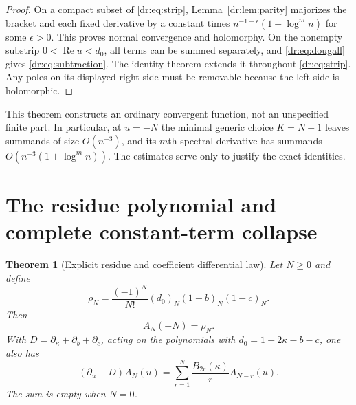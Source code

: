 \documentclass[11pt,letterpaper]{article}
\numberwithin{equation}{section}
\newtheorem{theorem}{Theorem}[section]
\theoremstyle{definition}
\theoremstyle{remark}
\DeclareMathOperator{\Rea}{Re}
\begin{document}
\begin{proof}
On a compact subset of \eqref{dr:eq:strip}, Lemma~\ref{dr:lem:parity}
majorizes the bracket and each fixed derivative by a constant times
$n^{-1-\epsilon}(1+\log^m n)$ for some $\epsilon>0$. This proves normal
convergence and holomorphy. On the nonempty substrip $0<\Rea u<d_0$,
all terms can be summed separately, and \eqref{dr:eq:dougall} gives
\eqref{dr:eq:subtraction}. The identity theorem extends it throughout
\eqref{dr:eq:strip}. Any poles on its displayed right side must be
removable because the left side is holomorphic.
\end{proof}

This theorem constructs an ordinary convergent function, not an
unspecified finite part. In particular, at $u=-N$ the minimal generic
choice $K=N+1$ leaves summands of size $O(n^{-3})$, and its $m$th
spectral derivative has summands $O(n^{-3}(1+\log^m n))$. The estimates
serve only to justify the exact identities.

\section{The residue polynomial and complete constant-term collapse}
\label{dr:sec:collapse}

\begin{theorem}[Explicit residue and coefficient differential law]
\label{dr:thm:coefficient-law}
Let $N\geq0$ and define
\begin{equation}
 \rho_N=\frac{(-1)^N}{N!}(d_0)_N(1-b)_N(1-c)_N.
 \label{dr:eq:rho}
\end{equation}
Then
\begin{equation}
 A_N(-N)=\rho_N.
 \label{dr:eq:residue}
\end{equation}
With $D=\partial_\kappa+\partial_b+\partial_c$, acting on the
polynomials with $d_0=1+2\kappa-b-c$, one also has
\begin{equation}
 (\partial_u-D)A_N(u)=
      \sum_{r=1}^N\frac{B_{2r}(\kappa)}r A_{N-r}(u).
 \label{dr:eq:law}
\end{equation}
The sum is empty when $N=0$.
\end{theorem}
\end{document}
